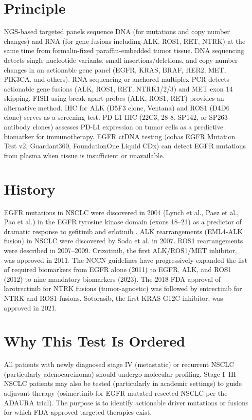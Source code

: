 \section*{Principle}
NGS-based targeted panels sequence DNA (for mutations and copy number changes) and RNA (for gene fusions including ALK, ROS1, RET, NTRK) at the same time from formalin-fixed paraffin-embedded tumor tissue. DNA sequencing detects single nucleotide variants, small insertions/deletions, and copy number changes in an actionable gene panel (EGFR, KRAS, BRAF, HER2, MET, PIK3CA, and others). RNA sequencing or anchored multiplex PCR detects actionable gene fusions (ALK, ROS1, RET, NTRK1/2/3) and MET exon 14 skipping. FISH using break-apart probes (ALK, ROS1, RET) provides an alternative method. IHC for ALK (D5F3 clone, Ventana) and ROS1 (D4D6 clone) serves as a screening test. PD-L1 IHC (22C3, 28-8, SP142, or SP263 antibody clones) assesses PD-L1 expression on tumor cells as a predictive biomarker for immunotherapy. EGFR ctDNA testing (cobas EGFR Mutation Test v2, Guardant360, FoundationOne Liquid CDx) can detect EGFR mutations from plasma when tissue is insufficient or unavailable.

\section*{History}
EGFR mutations in NSCLC were discovered in 2004 (Lynch et al., Paez et al., Pao et al.) in the EGFR tyrosine kinase domain (exons 18--21) as a predictor of dramatic response to gefitinib and erlotinib \cite{mok2009gefitinib}. ALK rearrangements (EML4-ALK fusion) in NSCLC were discovered by Soda et al. in 2007. ROS1 rearrangements were described in 2007--2009. Crizotinib, the first ALK/ROS1/MET inhibitor, was approved in 2011. The NCCN guidelines have progressively expanded the list of required biomarkers from EGFR alone (2011) to EGFR, ALK, and ROS1 (2012) to nine mandatory biomarkers (2023). The 2018 FDA approval of larotrectinib for NTRK fusions (tumor-agnostic) was followed by entrectinib for NTRK and ROS1 fusions. Sotorasib, the first KRAS G12C inhibitor, was approved in 2021.

\section*{Why This Test Is Ordered}
All patients with newly diagnosed stage IV (metastatic) or recurrent NSCLC (particularly adenocarcinoma) should undergo molecular profiling. Stage I--III NSCLC patients may also be tested (particularly in academic settings) to guide adjuvant therapy (osimertinib for EGFR-mutated resected NSCLC per the ADAURA trial). The purpose is to identify actionable driver mutations or fusions for which FDA-approved targeted therapies exist.

